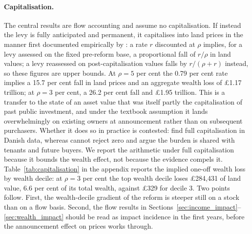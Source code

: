 \paragraph{Capitalisation.} The central results are flow accounting and assume no capitalisation. If instead the levy is fully anticipated and permanent, it capitalises into land prices in the manner first documented empirically by \citet{oates1969}: a rate $r$ discounted at $\rho$ implies, for a levy assessed on the fixed pre-reform base, a proportional fall of $r/\rho$ in land values; a levy reassessed on post-capitalisation values falls by $r/(\rho+r)$ instead, so these figures are upper bounds. At $\rho = 5$ per cent the 0.79 per cent rate implies a 15.7 per cent fall in land prices and an aggregate wealth loss of \pounds 1.17 trillion; at $\rho = 3$ per cent, a 26.2 per cent fall and \pounds 1.95 trillion. This is a transfer to the state of an asset value that was itself partly the capitalisation of past public investment, and under the textbook assumption it lands overwhelmingly on existing owners at announcement rather than on subsequent purchasers. Whether it does so in practice is contested: \citet{hoj2018} find full capitalisation in Danish data, whereas \citet{nielsson2024} cannot reject zero and argue the burden is shared with tenants and future buyers. We report the arithmetic under full capitalisation because it bounds the wealth effect, not because the evidence compels it. Table~\ref{tab:capitalisation} in the appendix reports the implied one-off wealth loss by wealth decile: at $\rho=3$ per cent the top wealth decile loses \pounds 284{,}431 of land value, 6.6 per cent of its total wealth, against \pounds 329 for decile 3. Two points follow. First, the wealth-decile gradient of the reform is steeper still on a stock than on a flow basis. Second, the flow results in Sections~\ref{sec:income_impact}--\ref{sec:wealth_impact} should be read as impact incidence in the first years, before the announcement effect on prices works through.
